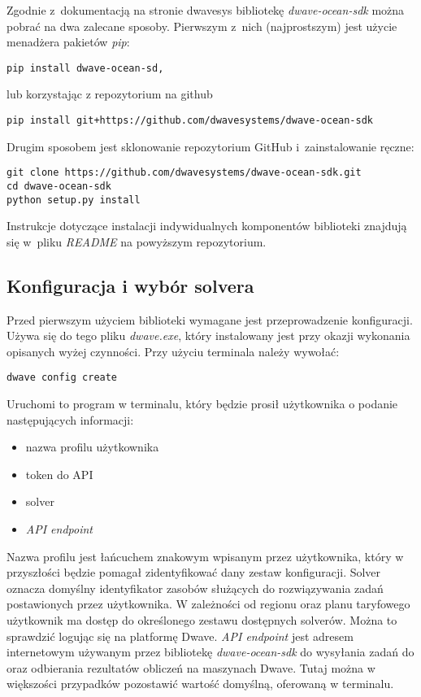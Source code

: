 \documentclass[12pt,a4paper,twoside,openany]{book}
\begin{document}
Zgodnie z~dokumentacją na stronie dwavesys bibliotekę \textit{dwave-ocean-sdk} można pobrać na dwa zalecane sposoby.
Pierwszym z~nich (najprostszym) jest użycie menadżera pakietów \textit{pip}:

\begin{verbatim}
pip install dwave-ocean-sd,
\end{verbatim}
lub korzystając z repozytorium na github \begin{verbatim}
pip install git+https://github.com/dwavesystems/dwave-ocean-sdk
\end{verbatim}
Drugim sposobem jest sklonowanie repozytorium GitHub i~zainstalowanie ręczne:

\begin{verbatim}
git clone https://github.com/dwavesystems/dwave-ocean-sdk.git
cd dwave-ocean-sdk
python setup.py install
\end{verbatim}
Instrukcje dotyczące instalacji indywidualnych komponentów biblioteki znajdują się w~pliku \textit{README} na powyższym repozytorium.

\subsection{Konfiguracja i wybór solvera}

Przed pierwszym użyciem biblioteki wymagane jest przeprowadzenie konfiguracji. Używa się do tego pliku \textit{dwave.exe}, który instalowany jest przy okazji wykonania opisanych wyżej czynności. Przy użyciu terminala należy wywołać:

\begin{verbatim}
dwave config create
\end{verbatim}

Uruchomi to program w terminalu, który będzie prosił użytkownika o podanie następujących informacji:
\begin{itemize}
    \item nazwa profilu użytkownika
    \item token do API
    \item solver
    \item \textit{API endpoint}
\end{itemize}

Nazwa profilu jest łańcuchem znakowym wpisanym przez użytkownika, który w przyszłości będzie pomagał zidentyfikować dany zestaw konfiguracji.
Solver oznacza domyślny identyfikator zasobów służących do rozwiązywania zadań postawionych przez użytkownika.
W zależności od regionu oraz planu taryfowego użytkownik ma dostęp do określonego zestawu dostępnych solverów.
Można to sprawdzić logując się na platformę Dwave.
\textit{API endpoint} jest adresem internetowym używanym przez bibliotekę \textit{dwave-ocean-sdk} do wysyłania zadań do oraz odbierania rezultatów obliczeń na maszynach Dwave.
Tutaj można w większości przypadków pozostawić wartość domyślną, oferowaną w terminalu.
\end{document}
